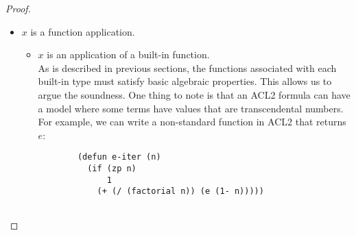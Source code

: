 \begin{proof}
\begin{itemize}
\begin{lstlisting}
    (store index1 v1
      (store index2 v2
        $\ldots$
          (store array-init indexk vk))))}
    \end{lstlisting}
    $x_2$ is a term that we can represent in the logic of \acs{SMT} solver.
    Thus, we construct $M_{smt}$ such that $M_{tcp}[(translate x)] \models
    (translate x2)$. All subterms of $M_{tcp}$ that are select operation that
    refer to $x$ have the same value as in $M_{tcp}$. In summary, we can
    construct an array that can be constructed from array initialization
    function and a finite number of store operations that is equivalent for the
    model $M_{tcp}$. Similar argument holds for other recursive types, for
    example, if $z$ is list-valued in ACL2, $M_{tcp}[z]$ could be a non-standard
    list. In this case, we can construct a standard list for $M_{smt}$ such that
    if $M_{tcp} \models \neg \Gtcp$, then $M_{smt} \models \neg \Gsmt$.
    
  \item $x$ is a function application. \\
    \begin{itemize}
    \item $x$ is an application of a built-in function. \\
      As is described in previous sections, the functions associated with each
      built-in type must satisfy basic algebraic properties. This allows us to
      argue the soundness. One thing to note is that an ACL2 formula can have a
      model where some terms have values that are transcendental numbers. For
      example, we can write a non-standard function in ACL2 that returns $e$:
      \begin{lstlisting}
        (defun e-iter (n)
          (if (zp n)
              1
            (+ (/ (factorial n)) (e (1- n)))))


\end{lstlisting}
\end{itemize}
\end{itemize}
\end{proof}
